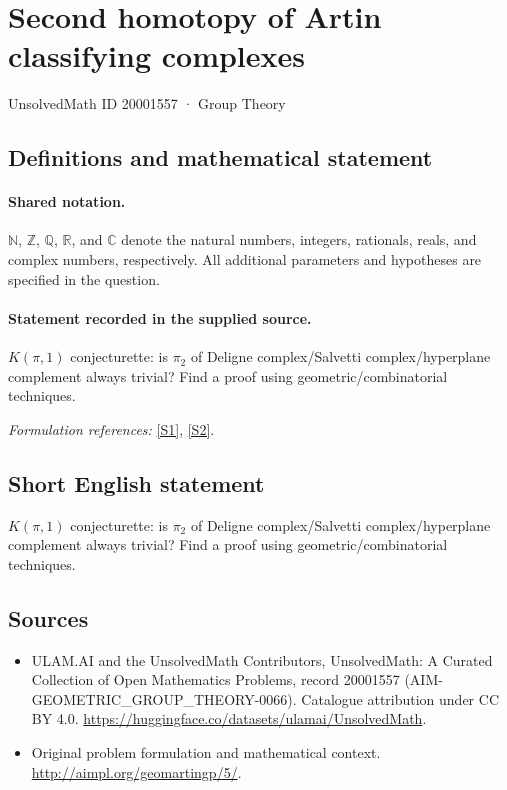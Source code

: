 \documentclass[11pt]{article}
\newcommand{\sref}[2]{\hyperlink{source:#1:#2}{[S#2]}}
\begin{document}
\setcounter{section}{20001556}
\section{Second homotopy of Artin classifying complexes}\label{20001557}
{\small UnsolvedMath ID 20001557 · Group Theory}
\subsection{Definitions and mathematical statement}

\paragraph{Shared notation.}$\mathbb N$, $\mathbb Z$, $\mathbb Q$, $\mathbb R$, and $\mathbb C$ denote the natural numbers, integers, rationals, reals, and complex numbers, respectively. All additional parameters and hypotheses are specified in the question.


\paragraph{Statement recorded in the supplied source.}
$K(\pi,1)$ conjecturette: is $\pi_2$ of Deligne complex/Salvetti complex/hyperplane complement always trivial? Find a proof using geometric/combinatorial techniques.
\par\smallskip\textit{Formulation references:} \sref{20001557}{1}, \sref{20001557}{2}.
\subsection{Short English statement}
$K(\pi,1)$ conjecturette: is $\pi_2$ of Deligne complex/Salvetti complex/hyperplane complement always trivial? Find a proof using geometric/combinatorial techniques.
\subsection{Sources}
\begin{itemize}
\item[\hypertarget{source:20001557:1}{S1}] ULAM.AI and the UnsolvedMath Contributors, UnsolvedMath: A Curated Collection of Open Mathematics Problems, record 20001557 (AIM-GEOMETRIC\_GROUP\_THEORY-0066). Catalogue attribution under CC BY 4.0.
\url{https://huggingface.co/datasets/ulamai/UnsolvedMath}.
\item[\hypertarget{source:20001557:2}{S2}] Original problem formulation and mathematical context.
\url{http://aimpl.org/geomartingp/5/}.
\end{itemize}
\label{end:20001557}
\end{document}
